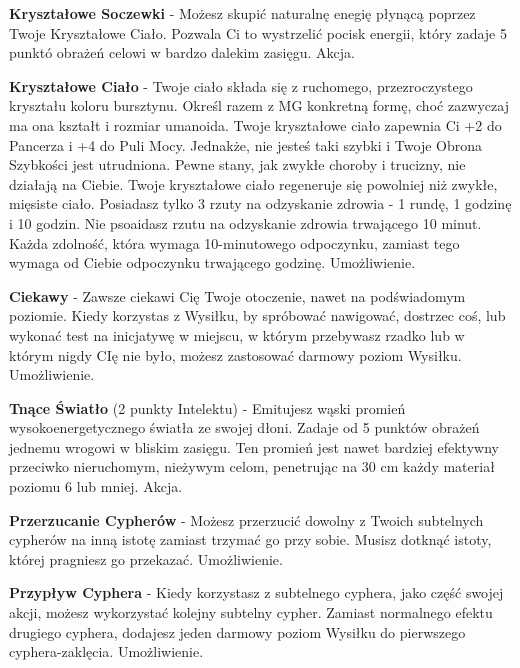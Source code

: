 {\textbf{Kryształowe Soczewki}\label{sec:Kryształowe Soczewki} - Możesz skupić naturalnę enegię płynącą poprzez Twoje Kryształowe Ciało. Pozwala Ci to wystrzelić pocisk energii, który zadaje 5 punktó obrażeń celowi w bardzo dalekim zasięgu. Akcja.

\textbf{Kryształowe Ciało}\label{sec:Kryształowe Ciało} - Twoje ciało składa się z ruchomego, przezroczystego kryształu koloru bursztynu. Określ razem z MG konkretną formę, choć zazwyczaj ma ona kształt i rozmiar umanoida. Twoje kryształowe ciało zapewnia Ci +2 do Pancerza i +4 do Puli Mocy. Jednakże, nie jesteś taki szybki i Twoje Obrona Szybkości jest utrudniona. Pewne stany, jak zwykłe choroby i trucizny, nie działają na Ciebie. Twoje kryształowe ciało regeneruje się powolniej niż zwykłe, mięsiste ciało. Posiadasz tylko 3 rzuty na odzyskanie zdrowia - 1 rundę, 1 godzinę i 10 godzin. Nie psoaidasz rzutu na odzyskanie zdrowia trwającego 10 minut. Każda zdolność, która wymaga 10-minutowego odpoczynku, zamiast tego wymaga od Ciebie odpoczynku trwającego godzinę. Umożliwienie. 

\textbf{Ciekawy}\label{sec:Ciekawy} - Zawsze ciekawi Cię Twoje otoczenie, nawet na podświadomym poziomie. Kiedy korzystas z Wysiłku, by spróbować nawigować, dostrzec coś, lub wykonać test na inicjatywę w miejscu, w którym przebywasz rzadko lub w którym nigdy CIę nie było, możesz zastosować darmowy poziom Wysiłku. Umożliwienie.

\textbf{Tnące Światło}\label{sec:Tnące Światło} (2 punkty Intelektu) - Emitujesz wąski promień wysokoenergetycznego światła ze swojej dłoni. Zadaje od 5 punktów obrażeń jednemu wrogowi w bliskim zasięgu. Ten promień jest nawet bardziej efektywny przeciwko nieruchomym, nieżywym celom, penetrując na 30 cm każdy materiał poziomu 6 lub mniej. Akcja.

\textbf{Przerzucanie Cypherów}\label{sec:Przerzucanie Cypherów} - Możesz przerzucić dowolny z Twoich subtelnych cypherów na inną istotę zamiast trzymać go przy sobie. Musisz dotknąć istoty, której pragniesz go przekazać. Umożliwienie. 

\textbf{Przypływ Cyphera}\label{sec:Przypływ Cyphera} - Kiedy korzystasz z subtelnego cyphera, jako część swojej akcji, możesz wykorzystać kolejny subtelny cypher. Zamiast normalnego efektu drugiego cyphera, dodajesz jeden darmowy poziom Wysiłku do pierwszego cyphera-zaklęcia. Umożliwienie. 

}
